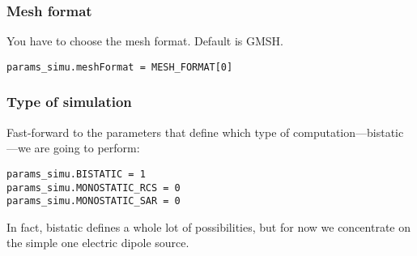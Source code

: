 \documentclass[a4paper,10pt]{book}
\begin{document}
\subsubsection{Mesh format}
%
\par
You have to choose the mesh format. Default is GMSH.
\begin{verbatim}
params_simu.meshFormat = MESH_FORMAT[0]
\end{verbatim}

\subsubsection{Type of simulation}
%
\par
Fast-forward to the parameters that define which type of computation---bistatic---we are going to perform:
\begin{verbatim}
params_simu.BISTATIC = 1
params_simu.MONOSTATIC_RCS = 0
params_simu.MONOSTATIC_SAR = 0
\end{verbatim}
In fact, bistatic defines a whole lot of possibilities, but for now we concentrate on the simple one electric dipole source.
\end{document}
